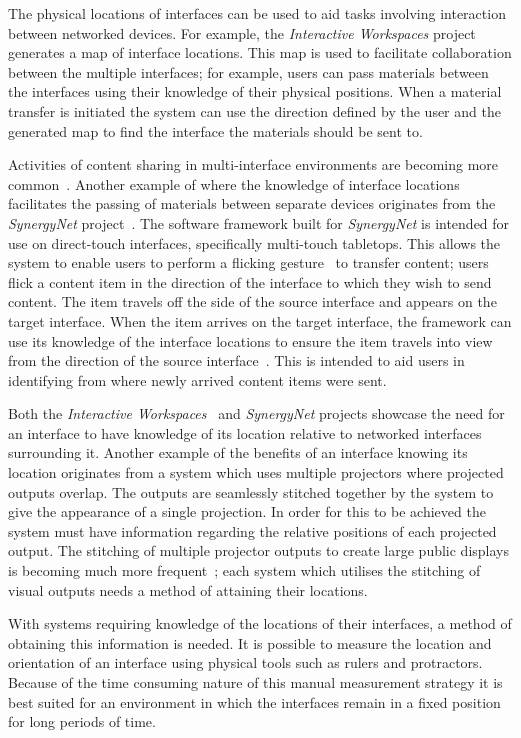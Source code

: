 \documentclass{bmcart}
\begin{document}
The physical locations of interfaces can be used to aid tasks involving interaction between networked devices.
For example, the {\emph{Interactive Workspaces}} project~\cite{Johanson2002} generates a map of interface locations.
This map is used to facilitate collaboration between the multiple interfaces; for example, users can pass materials between the interfaces using their knowledge of their physical positions.
When a material transfer is initiated the system can use the direction defined by the user and the generated map to find the interface the materials should be sent to.

Activities of content sharing in multi-interface environments are becoming more common~\cite{Nacenta2009}.
Another example of where the knowledge of interface locations facilitates the passing of materials between separate devices originates from the {\emph{SynergyNet}} project~\cite{Burd2009}.
The software framework built for {\emph{SynergyNet}} is intended for use on direct-touch interfaces, specifically multi-touch tabletops.
This allows the system to enable users to perform a flicking gesture~\cite{Reetz2006} to transfer content; users flick a content item in the direction of the interface to which they wish to send content.
The item travels off the side of the source interface and appears on the target interface.
When the item arrives on the target interface, the framework can use its knowledge of the interface locations to ensure the item travels into view from the direction of the source interface~\cite{McNaughton2017}.
This is intended to aid users in identifying from where newly arrived content items were sent.

Both the {\emph{Interactive Workspaces}}~\cite{Johanson2002} and {\emph{SynergyNet}} projects showcase the need for an interface to have knowledge of its location relative to networked interfaces surrounding it.
Another example of the benefits of an interface knowing its location originates from a system which uses multiple projectors where projected outputs overlap.
The outputs are seamlessly stitched together by the system to give the appearance of a single projection.
In order for this to be achieved the system must have information regarding the relative positions of each projected output.
The stitching of multiple projector outputs to create large public displays is becoming much more frequent~\cite{Jones2011}; each system which utilises the stitching of visual outputs needs a method of attaining their locations.

With systems requiring knowledge of the locations of their interfaces, a method of obtaining this information is needed.
It is possible to measure the location and orientation of an interface using physical tools such as rulers and protractors. 
Because of the time consuming nature of this manual measurement strategy it is best suited for an environment in which the interfaces remain in a fixed position for long periods of time.
\end{document}
